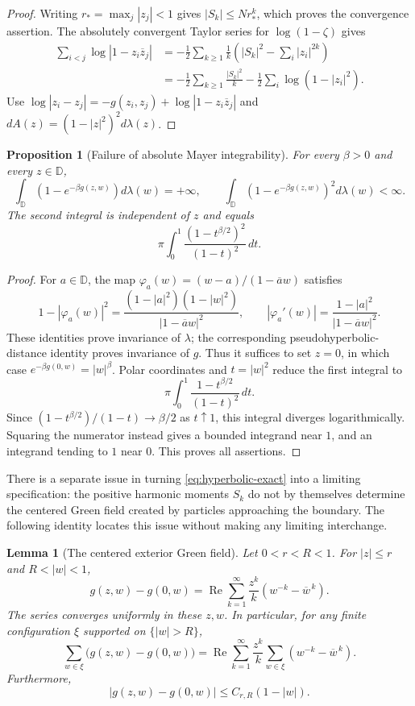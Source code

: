 \documentclass[11pt,a4paper]{article}
\numberwithin{equation}{section}
\newtheorem{proposition}[theorem]{Proposition}
\newtheorem{lemma}[theorem]{Lemma}
\theoremstyle{definition}
\theoremstyle{remark}
\begin{document}
\begin{proof}
Writing $r_* =\max_j|z_j|<1$ gives $|S_k|\le Nr_*^k$,
which proves the convergence assertion.  The absolutely convergent Taylor
series for $\log(1-\zeta)$ gives
\begin{align*}
 \sum_{i<j}\log|1-z_i\overline z_j|
 &=-\frac12\sum_{k\ge1}\frac1k
   \left(|S_k|^2-\sum_i|z_i|^{2k}\right)\\
 &=-\frac12\sum_{k\ge1}\frac{|S_k|^2}{k}
   -\frac12\sum_i\log(1-|z_i|^2).
\end{align*}
Use $\log|z_i-z_j|=-g(z_i,z_j)+\log|1-z_i\overline z_j|$
and $dA(z)=(1-|z|^2)^2d\lambda(z)$.
\end{proof}

\begin{proposition}[Failure of absolute Mayer integrability]
\label{prop:hyperbolic-mayer}
For every $\beta>0$ and every $z\in\mathbb D$,
\[
 \int_{\mathbb D}\left(1-e^{-\beta g(z,w)}\right)d\lambda(w)=+\infty,
 \qquad
 \int_{\mathbb D}\left(1-e^{-\beta g(z,w)}\right)^2d\lambda(w)<\infty.
\]
The second integral is independent of $z$ and equals
\[
 \pi\int_0^1\frac{(1-t^{\beta/2})^2}{(1-t)^2}\,dt.
\]
\end{proposition}

\begin{proof}
For $a\in\mathbb D$, the map
$\varphi_a(w)=(w-a)/(1-\overline a w)$ satisfies
\[
 1-|\varphi_a(w)|^2
   =\frac{(1-|a|^2)(1-|w|^2)}{|1-\overline a w|^2},\qquad
 |\varphi_a'(w)|
   =\frac{1-|a|^2}{|1-\overline a w|^2}.
\]
These identities prove invariance of $\lambda$; the corresponding
pseudohyperbolic-distance identity proves invariance of $g$.  Thus it
suffices to set $z=0$, in which case $e^{-\beta g(0,w)}=|w|^\beta$.
Polar coordinates and $t=|w|^2$ reduce the first integral to
\[
 \pi\int_0^1\frac{1-t^{\beta/2}}{(1-t)^2}\,dt.
\]
Since $(1-t^{\beta/2})/(1-t)\to\beta/2$ as $t\uparrow1$, this
integral diverges logarithmically.  Squaring the numerator instead gives
a bounded integrand near $1$, and an integrand tending to $1$ near $0$.
This proves all assertions.
\end{proof}

There is a separate issue in turning \eqref{eq:hyperbolic-exact} into a
limiting specification: the positive harmonic moments $S_k$ do not by
themselves determine the centered Green field created by particles
approaching the boundary.  The following identity locates this issue
without making any limiting interchange.

\begin{lemma}[The centered exterior Green field]
\label{lem:centered-exterior-green}
Let $0<r<R<1$.  For $|z|\le r$ and $R<|w|<1$,
\[
 g(z,w)-g(0,w)
  =\operatorname{Re}\sum_{k=1}^{\infty}
       \frac{z^k}{k}\left(w^{-k}-\overline w^{\,k}\right).
\]
The series converges uniformly in these $z,w$.  In particular, for any
finite configuration $\xi$ supported on $\{|w|>R\}$,
\[
 \sum_{w\in\xi}\bigl(g(z,w)-g(0,w)\bigr)
 =\operatorname{Re}\sum_{k=1}^{\infty}\frac{z^k}{k}
     \sum_{w\in\xi}(w^{-k}-\overline w^{\,k}).
\]
Furthermore,
\[
 |g(z,w)-g(0,w)|\le C_{r,R}(1-|w|).
\]
\end{lemma}
\end{document}

